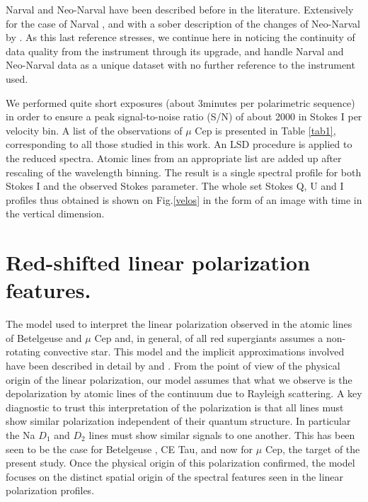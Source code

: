 \documentclass{/Users/art2/TeX/aanda/aa}
\begin{document}
Narval and Neo-Narval have been described before in the literature. Extensively for the case of Narval \citep{Donati2006}, and with a sober description of the changes  of Neo-Narval by \cite{LA22}.  As this last reference stresses, we continue here in noticing the continuity of data quality from the instrument through its upgrade, and handle Narval and Neo-Narval data as a unique dataset with no further reference to the instrument used.

We performed quite short exposures (about 3minutes per polarimetric sequence) in order to ensure a peak signal-to-noise ratio (S/N) of about 2000 in Stokes I per velocity bin.
A list of  the observations of $\mu$ Cep  is presented in Table \ref{tab1}, corresponding to all those studied in this work. An LSD procedure \citep{Donati2006} is applied to the reduced spectra. Atomic lines from an appropriate list \citep{Auriere_2016} are added up after rescaling of the wavelength binning. The result is a single spectral profile for both Stokes I and the observed Stokes parameter.
The whole set Stokes Q, U  and I profiles thus obtained is  shown on Fig.\ref{velos} in the form of an image with time in the vertical dimension.%

\section{Red-shifted linear polarization features.}
The model used to interpret the linear polarization observed in the atomic lines of Betelgeuse and $\mu$ Cep and, in general, of all red supergiants assumes a non-rotating convective star. This model and the implicit approximations involved have been described in detail by \cite{LA18} and \cite{LA22}. From the point of view of the physical origin of the linear polarization, our model assumes that what we observe is the depolarization by atomic lines of the continuum due to Rayleigh scattering. A key diagnostic to trust this interpretation of the polarization is that all lines must show similar polarization independent of their quantum structure. In particular the Na $D_1$ and $D_2$ lines must show similar signals to one another. This has been seen to be the case for Betelgeuse \citep{Auriere_2016}, CE Tau, and now for $\mu$ Cep,  the target of the present study. Once the physical  origin of this polarization confirmed,  the model focuses on the distinct spatial origin of the spectral features seen in the linear polarization profiles.
\end{document}
